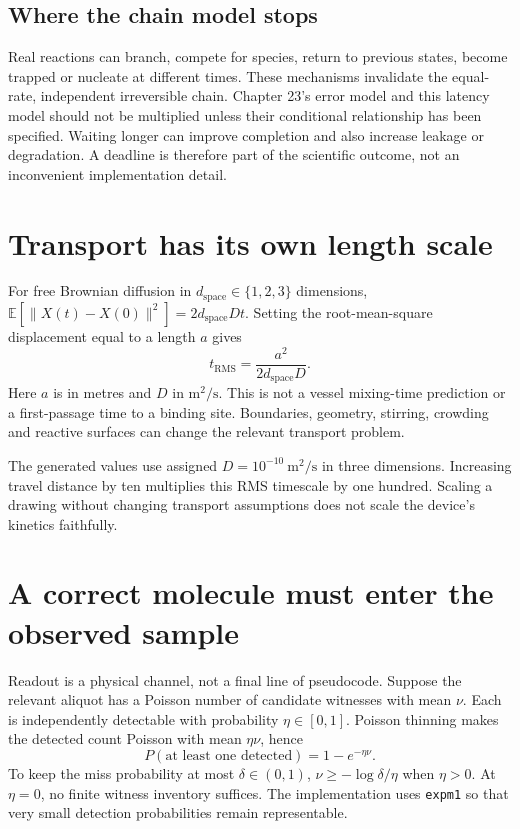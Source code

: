 \subsection{Where the chain model stops}
Real reactions can branch, compete for species, return to previous states, become
trapped or nucleate at different times. These mechanisms invalidate the equal-rate,
independent irreversible chain. Chapter 23's error model and this latency model
should not be multiplied unless their conditional relationship has been specified.
Waiting longer can improve completion and also increase leakage or degradation.
A deadline is therefore part of the scientific outcome, not an inconvenient
implementation detail.

\section{Transport has its own length scale}
For free Brownian diffusion in $d_{\mathrm{space}}\in\{1,2,3\}$ dimensions,
$\mathbb E[\|X(t)-X(0)\|^2]=2d_{\mathrm{space}}Dt$.
Setting the root-mean-square displacement equal to a length $a$ gives
\begin{equation}
t_{\mathrm{RMS}}=\frac{a^2}{2d_{\mathrm{space}}D}.
\label{dnad24:diffusion}
\end{equation}
Here $a$ is in metres and $D$ in $\mathrm{m}^2/\mathrm{s}$.
This is not a vessel mixing-time prediction or a first-passage time to a binding
site. Boundaries, geometry, stirring, crowding and reactive surfaces can change the
relevant transport problem.
\begin{center}\small\end{center}
The generated values use assigned $D=10^{-10}\ \mathrm{m}^2/\mathrm{s}$ in three
dimensions. Increasing travel distance by ten multiplies this RMS timescale by
one hundred. Scaling a drawing without changing transport assumptions does not
scale the device's kinetics faithfully.

\section{A correct molecule must enter the observed sample}
Readout is a physical channel, not a final line of pseudocode. Suppose the relevant
aliquot has a Poisson number of candidate witnesses with mean $\nu$.
Each is independently detectable with probability $\eta\in[0,1]$.
Poisson thinning makes the detected count Poisson with mean $\eta\nu$, hence
\begin{equation}
P(\text{at least one detected})=1-e^{-\eta\nu}.
\label{dnad24:detect}
\end{equation}
To keep the miss probability at most $\delta\in(0,1)$,
$\nu\ge-\log\delta/\eta$ when $\eta>0$.
At $\eta=0$, no finite witness inventory suffices. The implementation uses
\texttt{expm1} so that very small detection probabilities remain representable.
\begin{center}\small\end{center}

